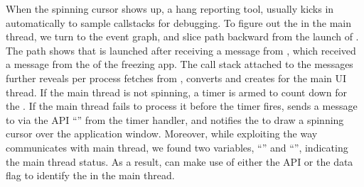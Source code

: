 When the spinning cursor shows up, a hang reporting tool, \spindump usually
kicks in automatically to sample callstacks for debugging. To figure out the
\spinningnode in the main thread, we turn to the event graph, and slice path
backward from the launch of \spindump.
The path shows that \spindump is launched after receiving a message from
, which received a message from the  of
the freezing app. The call stack attached to the messages further reveals
 per process fetches  from
, converts and creates  for the main UI
thread. If the main thread is not spinning, a timer is armed to count down
for the . If the main thread fails to process it before the timer
fires,  sends a message to  via the API
``'' from the timer handler, and 
notifies the  to draw a spinning cursor over the application
window. Moreover, while exploiting the way  communicates with
main thread, we found two variables, ``'' and
``'', indicating the main thread status. As a
result, \xxx can make use of either the API or the data flag to identify the
\spinningnode in the main thread.




